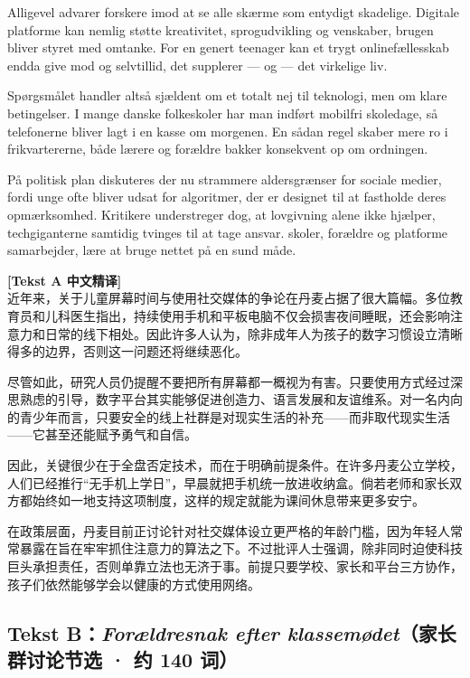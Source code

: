 Alligevel advarer forskere imod at se alle skærme som entydigt skadelige. Digitale platforme kan nemlig støtte kreativitet, sprogudvikling og venskaber,  brugen bliver styret med omtanke. For en genert teenager kan et trygt onlinefællesskab endda give mod og selvtillid,  det supplerer --- og  --- det virkelige liv.

Spørgsmålet handler altså sjældent om et totalt nej til teknologi, men om klare betingelser. I mange danske folkeskoler har man indført mobilfri skoledage, så telefonerne bliver lagt i en kasse om morgenen. En sådan regel skaber mere ro i frikvartererne,  både lærere og forældre bakker konsekvent op om ordningen.

På politisk plan diskuteres der nu strammere aldersgrænser for sociale medier, fordi unge ofte bliver udsat for algoritmer, der er designet til at fastholde deres opmærksomhed. Kritikere understreger dog, at lovgivning alene ikke hjælper,  techgiganterne samtidig tvinges til at tage ansvar.  skoler, forældre og platforme samarbejder,  lære at bruge nettet på en sund måde.

\begin{transbox}
\small
\textbf{\color{NCDTeal}[Tekst A 中文精译]}\\
近年来，关于儿童屏幕时间与使用社交媒体的争论在丹麦占据了很大篇幅。多位教育员和儿科医生指出，持续使用手机和平板电脑不仅会损害夜间睡眠，还会影响注意力和日常的线下相处。因此许多人认为，除非成年人为孩子的数字习惯设立清晰得多的边界，否则这一问题还将继续恶化。

尽管如此，研究人员仍提醒不要把所有屏幕都一概视为有害。只要使用方式经过深思熟虑的引导，数字平台其实能够促进创造力、语言发展和友谊维系。对一名内向的青少年而言，只要安全的线上社群是对现实生活的补充——而非取代现实生活——它甚至还能赋予勇气和自信。

因此，关键很少在于全盘否定技术，而在于明确前提条件。在许多丹麦公立学校，人们已经推行“无手机上学日”，早晨就把手机统一放进收纳盒。倘若老师和家长双方都始终如一地支持这项制度，这样的规定就能为课间休息带来更多安宁。

在政策层面，丹麦目前正讨论针对社交媒体设立更严格的年龄门槛，因为年轻人常常暴露在旨在牢牢抓住注意力的算法之下。不过批评人士强调，除非同时迫使科技巨头承担责任，否则单靠立法也无济于事。前提只要学校、家长和平台三方协作，孩子们依然能够学会以健康的方式使用网络。
\end{transbox}

\subsection*{Tekst B：\textit{Forældresnak efter klassemødet}（家长群讨论节选 · 约 140 词）}

